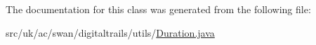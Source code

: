 The documentation for this class was generated from the following file\+:\begin{DoxyCompactItemize}
\item 
src/uk/ac/swan/digitaltrails/utils/\hyperlink{_duration_8java}{Duration.\+java}\end{DoxyCompactItemize}
